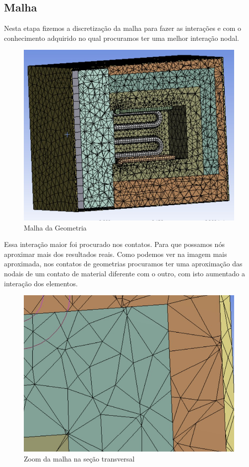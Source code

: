 \subsection{Malha}
Nesta etapa fizemos a discretização da malha para fazer as interações e com o
conhecimento adquirido no qual procuramos ter uma melhor interação nodal.
\begin{figure}[ht]
	\centering
	\label{ansys_malha1}
	\includegraphics[keepaspectratio=true,scale=0.8]{figuras/ansys_malha1.jpg}
	\caption{Malha da Geometria}
\end{figure}

Essa interação maior foi procurado nos contatos. Para que possamos nós aproximar mais dos
resultados reais. Como podemos ver na imagem mais aproximada, nos contatos de geometrias
procuramos ter uma aproximação das nodais de um contato de material diferente com o outro, com
isto aumentado a interação dos elementos.
\begin{figure}[ht]
	\centering
	\label{ansys_malha2}
	\includegraphics[keepaspectratio=true,scale=0.8]{figuras/ansys_malha2.jpg}
	\caption{Zoom da malha na seção transversal}
\end{figure}

